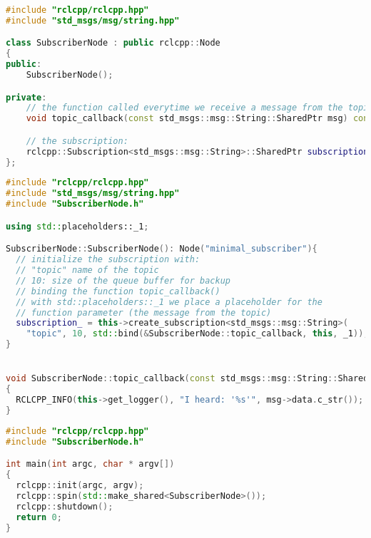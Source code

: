\begin{lstlisting}[language=C++, caption={Subscriber.hpp}, firstnumber=0, label={code:hello_world_subscriber_hpp}]
#include "rclcpp/rclcpp.hpp"
#include "std_msgs/msg/string.hpp"

class SubscriberNode : public rclcpp::Node
{
public:
    SubscriberNode();

private:
    // the function called everytime we receive a message from the topic:
    void topic_callback(const std_msgs::msg::String::SharedPtr msg) const;

    // the subscription:
    rclcpp::Subscription<std_msgs::msg::String>::SharedPtr subscription_;
};
\end{lstlisting}


\begin{lstlisting}[language=C++, caption={Subscriber.cpp}, firstnumber=0, label={code:hello_world_subscriber_cpp}]
#include "rclcpp/rclcpp.hpp"
#include "std_msgs/msg/string.hpp"
#include "SubscriberNode.h"

using std::placeholders::_1;

SubscriberNode::SubscriberNode(): Node("minimal_subscriber"){
  // initialize the subscription with:
  // "topic" name of the topic
  // 10: size of the queue buffer for backup
  // binding the function topic_callback()
  // with std::placeholders::_1 we place a placeholder for the 
  // function parameter (the message from the topic)
  subscription_ = this->create_subscription<std_msgs::msg::String>(
    "topic", 10, std::bind(&SubscriberNode::topic_callback, this, _1));
}


void SubscriberNode::topic_callback(const std_msgs::msg::String::SharedPtr msg) const
{
  RCLCPP_INFO(this->get_logger(), "I heard: '%s'", msg->data.c_str());
}
\end{lstlisting}


\begin{lstlisting}[language=C++, caption={mainSubscriber.cpp}, firstnumber=0, label={code:hello_world_subscriber_main}]
#include "rclcpp/rclcpp.hpp"
#include "SubscriberNode.h"

int main(int argc, char * argv[])
{
  rclcpp::init(argc, argv);
  rclcpp::spin(std::make_shared<SubscriberNode>());
  rclcpp::shutdown();
  return 0;
}
\end{lstlisting}

